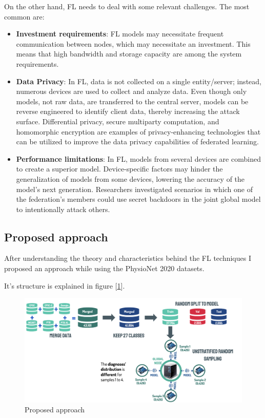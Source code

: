 On the other hand, FL needs to deal with some relevant challenges. The most common are:

\begin{itemize}
    \item \textbf{Investment requirements}: FL models may necessitate frequent communication between nodes, which may necessitate an investment. This means that high bandwidth and storage capacity are among the system requirements.
    
    \item \textbf{Data Privacy}: In FL, data is not collected on a single entity/server; instead, numerous devices are used to collect and analyze data. Even though only models, not raw data, are transferred to the central server, models can be reverse engineered to identify client data, thereby increasing the attack surface. Differential privacy, secure multiparty computation, and homomorphic encryption are examples of privacy-enhancing technologies that can be utilized to improve the data privacy capabilities of federated learning.
    
    \item \textbf{Performance limitations}: In FL, models from several devices are combined to create a superior model. Device-specific factors may hinder the generalization of models from some devices, lowering the accuracy of the model's next generation. Researchers investigated scenarios in which one of the federation's members could use secret backdoors in the joint global model to intentionally attack others.
\end{itemize}

\subsection{Proposed approach} \label{proposed_approaches}

After understanding the theory and characteristics behind the FL techniques I proposed an approach while using the PhysioNet 2020 datasets.

It's structure is explained in figure [\ref{fig:fl_approach}].

\begin{figure}[H]
\centering
\includegraphics[scale=0.4]{img/fl_approach.png}
\caption{Proposed approach}
\label{fig:fl_approach}
\end{figure}

